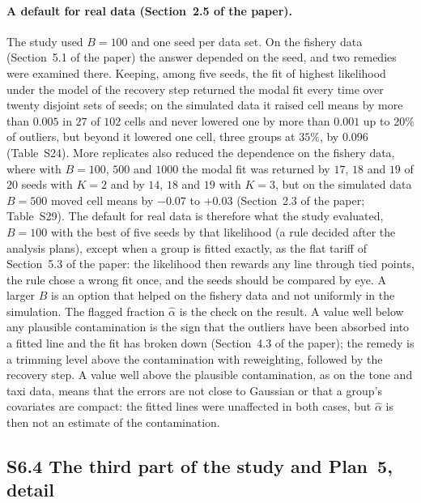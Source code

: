 \paragraph{A default for real data (Section~2.5 of the paper).} The study used $B=100$ and one seed per data set. On the
fishery data (Section~5.1 of the paper) the answer depended on the seed, and two remedies
were examined there. Keeping, among five seeds, the fit of highest likelihood under the model
of the recovery step returned the modal fit every time over twenty disjoint sets of seeds; on
the simulated data it raised cell means by more than $0.005$ in $27$ of $102$ cells and never
lowered one by more than $0.001$ up to $20\%$ of outliers, but beyond it lowered one cell,
three groups at $35\%$, by $0.096$ (Table~S24). More replicates also reduced the
dependence on the fishery data, where with $B=100$, $500$ and $1000$ the modal fit was returned
by $17$, $18$ and $19$ of $20$ seeds with $K=2$ and by $14$, $18$ and $19$ with $K=3$, but on
the simulated data $B=500$ moved cell means by $-0.07$ to $+0.03$ (Section~2.3 of the paper;
Table~S29). The default for real data is therefore what the study evaluated,
$B=100$ with the best of five seeds by that likelihood (a rule decided after the analysis plans), except when a group is fitted exactly,
as the flat tariff of Section~5.3 of the paper: the likelihood then rewards any line through
tied points, the rule chose a wrong fit once, and the seeds should be compared by eye. A larger
$B$ is an option that helped on the fishery data and not uniformly in the simulation.
The flagged fraction $\hat\alpha$ is the check on the result. A value well below any plausible
contamination is the sign that the outliers have been absorbed into a fitted line and the fit
has broken down (Section~4.3 of the paper); the remedy is a trimming level above the
contamination with reweighting, followed by the recovery step. A value well above the
plausible contamination, as on the tone and taxi data, means that the errors are not close to
Gaussian or that a group's covariates are compact: the fitted lines were unaffected in both
cases, but $\hat\alpha$ is then not an estimate of the contamination.

\subsection*{S6.4 The third part of the study and Plan~5, detail}

